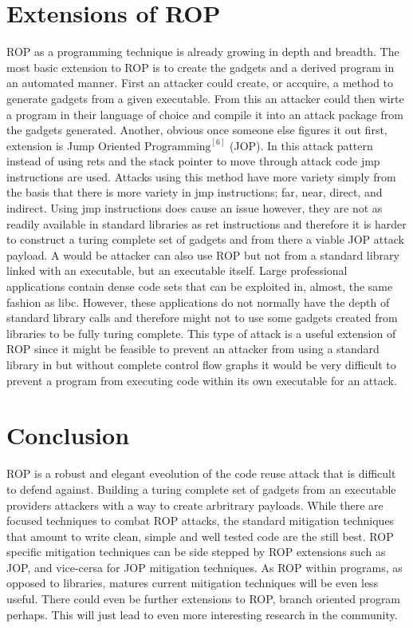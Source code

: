 \documentclass[11pt]{amsart}
\begin{document}
\section*{Extensions of ROP}
ROP as a programming technique is already growing in depth and breadth. The most basic extension to ROP is to create the gadgets and a derived program in an automated manner. First an attacker could create, or accquire, a method to generate gadgets from a given executable. From this an attacker could then wirte a program in their language of choice and compile it into an attack package from the gadgets generated.\newline \newline
Another, obvious once someone else figures it out first, extension is Jump Oriented $\text{Programming}^{[6]}$ (JOP). In this attack pattern instead of using rets and the stack pointer to move through attack code jmp instructions are used. Attacks using this method have more variety simply from the basis that there is more variety in jmp instructions; far, near, direct, and indirect. Using jmp instructions does cause an issue however, they are not as readily available in standard libraries as ret instructions and therefore it is harder to construct a turing complete set of gadgets and from there a viable JOP attack payload.\newline \newline
A would be attacker can also use ROP but not from a standard library linked with an executable, but an executable itself. Large professional applications contain dense code sets that can be exploited in, almost, the same fashion as libc. However, these applications do not normally have the depth of standard library calls and therefore might not to use some gadgets created from libraries to be fully turing complete. This type of attack is a useful extension of ROP since it might be feasible to prevent an attacker from using a standard library in but without complete control flow graphs it would be very difficult to prevent a program from executing code within its own executable for an attack.
\section*{Conclusion}
ROP is a robust and elegant eveolution of the code reuse attack that is difficult to defend against. Building a turing complete set of gadgets from an executable providers attackers with a way to create arbritrary payloads.  While there are focused techniques to combat ROP attacks, the standard mitigation techniques that amount to write clean, simple and well tested code are the still best. ROP specific mitigation techniques can be side stepped by ROP extensions such as JOP, and vice-cersa for JOP mitigation techniques. As ROP within programs, as opposed to libraries, matures current mitigation techniques will be even less useful. There could even be further extensions to ROP, branch oriented program perhaps.  This will just lead to even more interesting research in the community.
\end{document}
